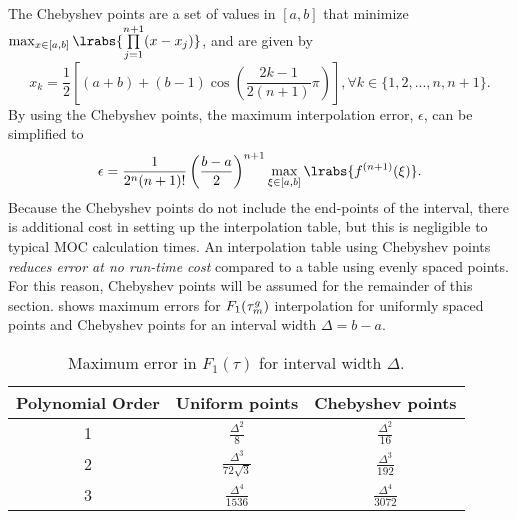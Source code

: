 {{{{        The Chebyshev points \cite{Stewart1996} are a set of values in $[a,b]$ that minimize $\max_{x\in[a,b]}\lrabs{\prodl[j=1][n+1](x-x_j)}$, and are given by
        \begin{equation}\label{eq:LSMOC:ET:Chebyshev Points}
          x_k = \frac{1}{2}\left[(a+b)+(b-1)\cos\left(\frac{2k-1}{2(n+1)}\pi\right)\right], \forall k\in\{1,2,...,n,n+1\}.
        \end{equation}
        By using the Chebyshev points, the maximum interpolation error, $\epsilon$, can be simplified to
        \begin{equation}\label{eq:LSMOC:ET:Chebyshev Interpolation Error}
          \epsilon = \frac{1}{2^n(n+1)!}\left(\frac{b-a}{2}\right)^{n+1}\max_{\xi\in[a,b]}\lrabs{f^{(n+1)}(\xi)}.
        \end{equation}
        Because the Chebyshev points do not include the end-points of the interval, there is additional cost in setting up the interpolation table, but this is negligible to typical \ac{MOC} calculation times.
        An interpolation table using Chebyshev points \emph{reduces error at no run-time cost} compared to a table using evenly spaced points.
        For this reason, Chebyshev points will be assumed for the remainder of this section.
         shows maximum errors for $F_1(\opt)$ interpolation for uniformly spaced points and Chebyshev points for an interval width $\Delta=b-a$.
        \begin{table}
          \centering
          \renewcommand{\arraystretch}{1.45}
          \caption{Maximum error in $F_1(\tau)$ for interval width $\Delta$.}
          \label{tab:LSMOC:ET:Chebyshev Error}
          \begin{tabular}{@{}ccc@{}}\toprule
            Polynomial Order & Uniform points   & Chebyshev points\\\midrule
            1                & $\frac{\Delta^2}{8}$           & $\frac{\Delta^2}{16}$\\
            2                & $\frac{\Delta^3}{72\sqrt{3}}$  & $\frac{\Delta^3}{192}$\\
            3                & $\frac{\Delta^4}{1536}$        & $\frac{\Delta^4}{3072}$\\\bottomrule
          \end{tabular}
        \end{table}
      }
}}}
